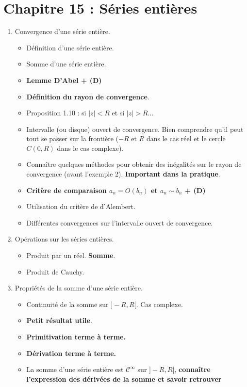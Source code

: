 \documentclass[twoside,a4paper,french,10pt]{VcCours}
\begin{document}
\section*{Chapitre 15 : Séries entières}
\begin{enumerate}
\item Convergence d'une série entière.
\begin{itemize}
\item Définition d'une série entière.
\item Somme d'une série entière.
\item \textbf{Lemme D'Abel + (D)}
\item \textbf{Définition du rayon de convergence}.
\item Proposition 1.10 : si $\vert z \vert < R$ et si $\vert z \vert >R$...
\item Intervalle (ou disque) ouvert de convergence. Bien comprendre qu'il peut tout se passer sur la frontière ($-R$ et $R$ dans le cas réel et le cercle $C(0,R)$ dans le cas complexe).
\item Connaître quelques méthodes pour obtenir des inégalités sur le rayon de convergence (avant l'exemple 2). \textbf{Important dans la pratique}.
\item \textbf{Critère de comparaison $a_n = O(b_n)$ et $a_n \sim b_n$ + (D)}
\item Utilisation du critère de d'Alembert.
\item Différentes convergences sur l'intervalle ouvert de convergence.
\end{itemize}
\item Opérations sur les séries entières.
\begin{itemize}
\item Produit par un réel. \textbf{Somme}. 
\item Produit de Cauchy.
\end{itemize}
\item Propriétés de la somme d'une série entière.
\begin{itemize}
\item Continuité de la somme sur $]-R,R[$. Cas complexe.
\item \textbf{Petit résultat utile}.
\item \textbf{Primitivation terme à terme.}
\item \textbf{Dérivation terme à terme.}
\item La somme d'une série entière est $\mathcal{C}^{\infty}$ sur $]-R,R[$, 
\textbf{connaître l'expression des dérivées de la somme et savoir retrouver 
}
\end{itemize}
\end{enumerate}
\end{document}

